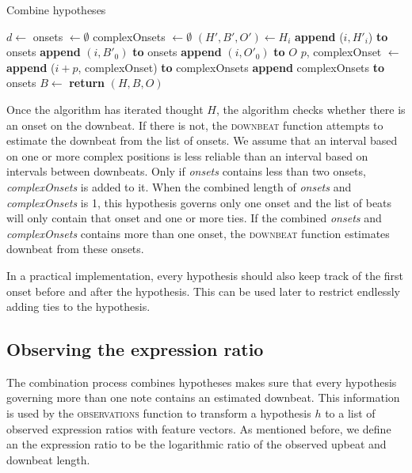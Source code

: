 \begin{algorithm}
\caption{Combine hypotheses}
\label{alg:combination}
\begin{algorithmic}
	\State $d \leftarrow$ 
	\State onsets $\leftarrow \emptyset$
	\State complexOnsets $\leftarrow \emptyset$
		\State $(H', B', O') \leftarrow H_i$
			\State \textbf{append} ($i, H'_i$) \textbf{to} onsets
		\Else
				\State \textbf{append} $(i, B'_0)$ \textbf{to} onsets
				\State \textbf{append} $(i, O'_0)$ \textbf{to} $O$
			\EndIf
			\Else
				\State $p$, complexOnset $\leftarrow$ 
				\State \textbf{append} ($i + p$, complexOnset) \textbf{to} complexOnsets
			\EndIf
		\EndIf
	\EndFor
		\State \textbf{append} complexOnsets \textbf{to} onsets
	\EndIf
	\State $B \leftarrow$ 
	\State \textbf{return} $(H, B, O)$
\EndFunction
\end{algorithmic}
\end{algorithm}

Once the algorithm has iterated thought $H$, the algorithm checks whether there is an onset on the downbeat. If there is not, the \textsc{downbeat} function attempts to estimate the downbeat from the list of onsets. We assume that an interval based on one or more complex positions is less reliable than an interval based on intervals between downbeats. Only if \textit{onsets} contains less than two onsets, \textit{complexOnsets} is added to it. When the combined length of \textit{onsets} and \textit{complexOnsets} is 1, this hypothesis governs only one onset and the list of beats will only contain that onset and one or more ties. If the combined \textit{onsets} and \textit{complexOnsets} contains more than one onset, the \textsc{downbeat} function estimates downbeat from these onsets.

In a practical implementation, every hypothesis should also keep track of the first onset before and after the hypothesis. This can be used later to restrict endlessly adding ties to the hypothesis.

\subsection{Observing the expression ratio}
\label{sec:observations}

The combination process combines hypotheses makes sure that every hypothesis governing more than one note contains an estimated downbeat. This information is used by the \textsc{observations} function to transform a hypothesis $h$ to a list of observed expression ratios with feature vectors. As mentioned before, we define an the expression ratio to be the logarithmic ratio of the observed upbeat and downbeat length.

